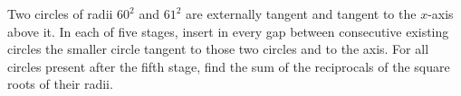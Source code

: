 Two circles of radii $60^2$ and $61^2$ are externally tangent and tangent to the $x$-axis above it. In each of five stages, insert in every gap between consecutive existing circles the smaller circle tangent to those two circles and to the axis. For all circles present after the fifth stage, find the sum of the reciprocals of the square roots of their radii.
